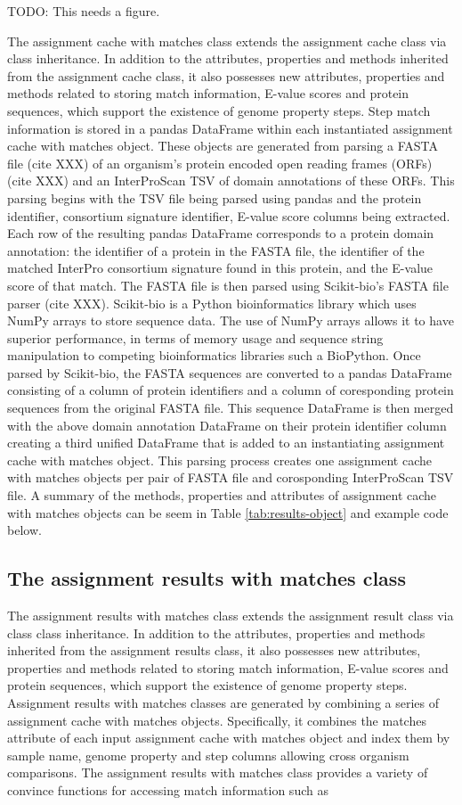 TODO: This needs a figure.

The assignment cache with matches class extends the assignment cache class via class inheritance. In addition to the attributes, properties and methods inherited from the assignment cache class, it also possesses new attributes, properties and methods related to storing match information, E-value scores and protein sequences, which support the existence of genome property steps. Step match information is stored in a pandas DataFrame within each instantiated assignment cache with matches object. These objects are generated from parsing a FASTA file (cite XXX) of an organism's protein encoded open reading frames (ORFs) (cite XXX) and an InterProScan TSV of domain annotations of these ORFs. This parsing begins with the TSV file being parsed using pandas and the protein identifier, consortium signature identifier, E-value score columns being extracted. Each row of the resulting pandas DataFrame corresponds to a protein domain annotation: the identifier of a protein in the FASTA file, the identifier of the matched InterPro consortium signature found in this protein, and the E-value score of that match. The FASTA file is then parsed using Scikit-bio's FASTA file parser (cite XXX). Scikit-bio is a Python bioinformatics library which uses NumPy arrays to store sequence data. The use of NumPy arrays allows it to have superior performance, in terms of memory usage and sequence string manipulation to competing bioinformatics libraries such a BioPython. Once parsed by Scikit-bio, the FASTA sequences are converted to a pandas DataFrame consisting of a column of protein identifiers and a column of coresponding protein sequences from the original FASTA file. This sequence DataFrame is then merged with the above domain annotation DataFrame on their protein identifier column creating a third unified DataFrame that is added to an instantiating assignment cache with matches object. This parsing process creates one assignment cache with matches objects per pair of FASTA file and corosponding InterProScan TSV file. A summary of the methods, properties and attributes of assignment cache with matches objects can be seem in Table \ref{tab:results-object} and example code below.

\subsection{The assignment results with matches class}

The assignment results with matches class extends the assignment result class via class class inheritance. In addition to the attributes, properties and methods inherited from the assignment results class, it also possesses new attributes, properties and methods related to storing match information, E-value scores and protein sequences, which support the existence of genome property steps. Assignment results with matches classes are generated by combining a series of assignment cache with matches objects. Specifically, it combines the matches attribute of each input assignment cache with matches object and index them by sample name, genome property and step columns allowing cross organism comparisons. The assignment results with matches class provides a variety of convince functions for accessing match information such as 